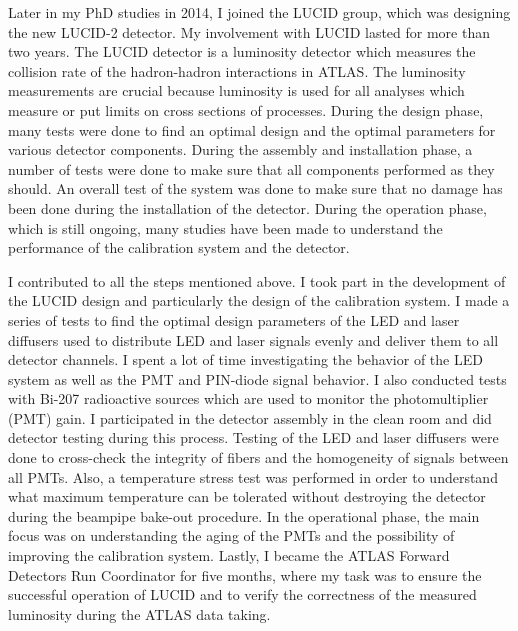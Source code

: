 \begin{preface}
Later in my PhD studies in 2014, I joined the LUCID group, which was designing the new LUCID-2 detector. My involvement with LUCID lasted for more than two years. The LUCID detector is a luminosity detector which measures the collision rate of the hadron-hadron interactions in ATLAS. The luminosity measurements are crucial because luminosity is used for all analyses which measure or put limits on cross sections of processes.
During the design phase, many tests were done to find an optimal design and the optimal parameters for various detector components.
During the assembly and installation phase, a number of tests were done to make sure that all components performed as they should.
An overall test of the system was done to make sure that no damage has been done during the installation of the detector.
During the operation phase, which is still ongoing, many studies have been made to understand the performance of the calibration system and the detector.

I contributed to all the steps mentioned above. I took part in the development of the LUCID design and particularly the design of the calibration system. 
I made a series of tests to find the optimal design parameters of the LED and laser diffusers used to distribute LED and laser signals evenly and deliver them to all 
detector channels. 
I spent a lot of time investigating the behavior of the LED system as well as the PMT and PIN-diode signal behavior.
I also conducted tests with Bi-207 radioactive sources which are used to monitor the photomultiplier (PMT) gain.
I participated in the detector assembly in the clean room and did detector testing during this process.
Testing of the LED and laser diffusers were done to cross-check the integrity of fibers and the homogeneity of signals between all PMTs.
Also, a temperature stress test was performed in order to understand what maximum temperature can be tolerated without destroying the detector during the 
beampipe bake-out procedure.
In the operational phase, the main focus was on understanding the aging of the PMTs and the possibility of improving the calibration system.
Lastly, I became the ATLAS Forward Detectors Run Coordinator for five months, where my task was to ensure the successful operation of LUCID and to verify the correctness of the measured luminosity during the ATLAS data taking.



\end{preface}
